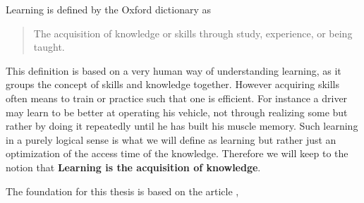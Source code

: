 \documentclass[../Master.tex]{subfiles}
\begin{document}
	
	Learning is defined by the Oxford dictionary as 
	\begin{quote}
		The acquisition of knowledge or skills through study, experience, or being taught.
	\end{quote}
	
	This definition is based on a very human way of understanding learning, as it groups the concept of skills and knowledge together.
	However acquiring skills often means to train or practice such that one is efficient. For instance a driver may learn to be better at operating his vehicle, not through realizing some but rather by doing it repeatedly until he has built his muscle memory.
	Such learning in a purely logical sense is what we will define as learning but rather just an optimization of the access time of the knowledge.
	Therefore we will keep to the notion that \textbf{Learning is the acquisition of knowledge}.
	
	The foundation for this thesis is based on the article \cite{Walsh2008},
	
	
	
\end{document}
